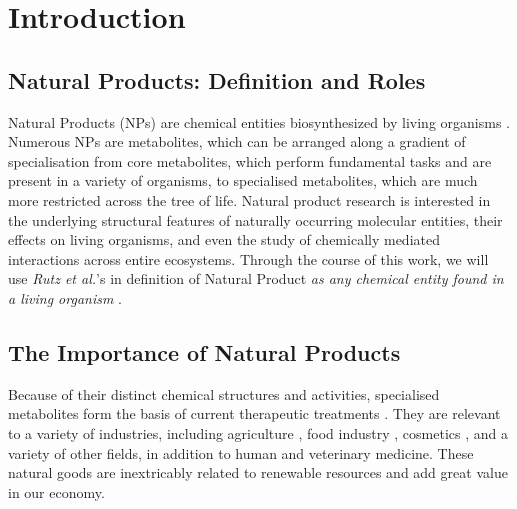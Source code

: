 \documentclass[
11pt, %
oneside, %
english, %
singlespacing, %
headsepline, %
chapterinoneline, %
]{MastersDoctoralThesis} %
\begin{document}



\mainmatter %

\pagestyle{thesis} %


%
% 
%
% 
% 
%

\chapter{Introduction}\label{chap:intro}

\section{Natural Products: Definition and Roles}\label{sec:NP def and roles}
Natural Products (NPs) are chemical entities biosynthesized by living organisms \cite{AllNatural2007}. Numerous NPs are metabolites, which can be arranged along a gradient of specialisation from core metabolites, which perform fundamental tasks and are present in a variety of organisms, to specialised metabolites, which are much more restricted across the tree of life. Natural product research is interested in the underlying structural features of naturally occurring molecular entities, their effects on living organisms, and even the study of chemically mediated interactions across entire ecosystems. Through the course of this work, we will use \textit{Rutz et al.}'s in definition of Natural Product \textit{as any chemical entity found in a living organism} \cite{rutzLOTUSInitiativeOpen2022}.

\section{The Importance of Natural Products}
Because of their distinct chemical structures and activities, specialised metabolites form the basis of current therapeutic treatments  \cite{harveyReemergenceNaturalProducts2015}. They are relevant to a variety of industries, including agriculture \cite{yanImpactProspectNatural2018}, food industry \cite{gonzalez-manzanoApplicationsNaturalProducts2021}, cosmetics \cite{liuNaturalProductsCosmetics2022}, and a variety of other fields, in addition to human and veterinary medicine. These natural goods are inextricably related to renewable resources and add great value in our economy.
\end{document}
